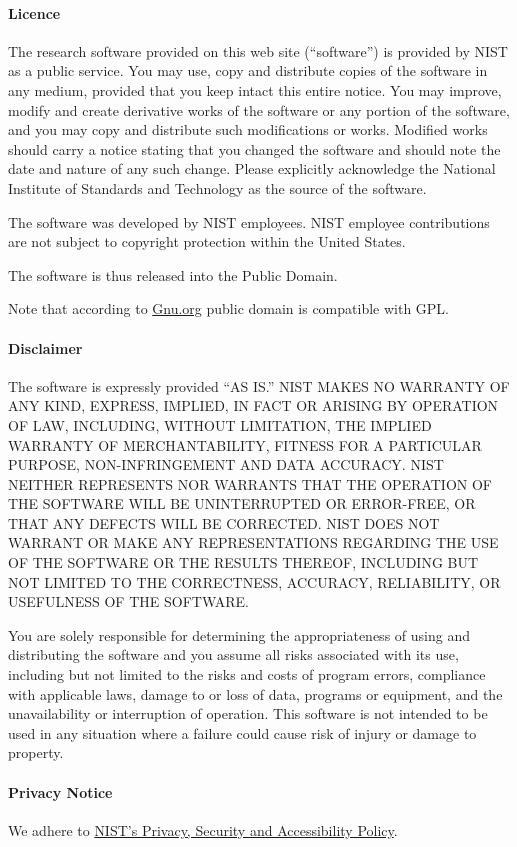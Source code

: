 \documentclass{article}
\begin{document}
\paragraph{Licence}
The research software provided on this web site (``software'') is
provided by NIST as a public service. You may use, copy and distribute
copies of the software in any medium, provided that you keep intact
this entire notice. You may improve, modify and create derivative
works of the software or any portion of the software, and you may copy
and distribute such modifications or works. Modified works should
carry a notice stating that you changed the software and should note
the date and nature of any such change. Please explicitly acknowledge
the National Institute of Standards and Technology as the source of
the software.

The software was developed by NIST employees. NIST employee
contributions are not subject to copyright protection within the
United States.

The software is thus released into the Public Domain.

Note that according to
\href{http://www.gnu.org/licences/license-list.html#PublicDomain}{Gnu.org}
public domain is compatible with GPL.

\paragraph{Disclaimer}
The software is expressly provided ``AS IS.'' NIST MAKES NO WARRANTY OF
ANY KIND, EXPRESS, IMPLIED, IN FACT OR ARISING BY OPERATION OF LAW,
INCLUDING, WITHOUT LIMITATION, THE IMPLIED WARRANTY OF
MERCHANTABILITY, FITNESS FOR A PARTICULAR PURPOSE, NON-INFRINGEMENT
AND DATA ACCURACY. NIST NEITHER REPRESENTS NOR WARRANTS THAT THE
OPERATION OF THE SOFTWARE WILL BE UNINTERRUPTED OR ERROR-FREE, OR THAT
ANY DEFECTS WILL BE CORRECTED. NIST DOES NOT WARRANT OR MAKE ANY
REPRESENTATIONS REGARDING THE USE OF THE SOFTWARE OR THE RESULTS
THEREOF, INCLUDING BUT NOT LIMITED TO THE CORRECTNESS, ACCURACY,
RELIABILITY, OR USEFULNESS OF THE SOFTWARE.

You are solely responsible for determining the appropriateness of
using and distributing the software and you assume all risks
associated with its use, including but not limited to the risks and
costs of program errors, compliance with applicable laws, damage to or
loss of data, programs or equipment, and the unavailability or
interruption of operation. This software is not intended to be used in
any situation where a failure could cause risk of injury or damage to
property.

\paragraph{Privacy Notice}
We adhere to \href{http://www.nist.gov/public_affairs/privacy.cfm}{NIST's Privacy, Security and Accessibility Policy}.
\end{document}
